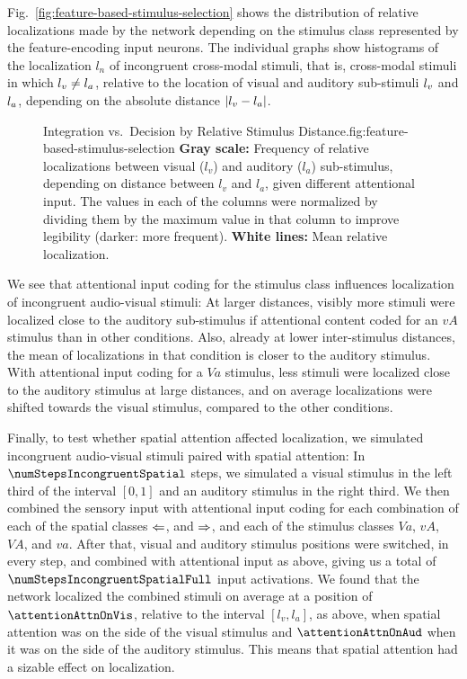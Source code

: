 		Fig.~\ref{fig:feature-based-stimulus-selection} shows the distribution of relative localizations made by the network depending on the stimulus class represented by the feature-encoding input neurons.
        The individual graphs show histograms of the localization $l_n$ of incongruent cross-modal stimuli, that is, cross-modal stimuli in which $l_v\neq l_a$, relative to the location of visual and auditory sub-stimuli $l_v$ and $l_a$, depending on the absolute distance $\lvert l_v-l_a\rvert$.
        \begin{figure}
            \centering
                \begin{legend}{Integration vs.\ Decision by Relative Stimulus Distance.}{fig:feature-based-stimulus-selection}
                    \textbf{Gray scale:} Frequency of relative localizations between visual ($l_v$) and auditory ($l_a$) sub-stimulus, depending on distance between $l_v$ and $l_a$, given different attentional input.
                    The values in each of the columns were normalized by dividing them by the maximum value in that column to improve legibility (darker: more frequent).
                    \textbf{White lines:} Mean relative localization.%
                \end{legend}
		\end{figure}
        We see that attentional input coding for the stimulus class influences localization of incongruent audio-visual stimuli:
        At larger distances, visibly more stimuli were localized close to the auditory sub-stimulus if attentional content coded for an $\mathit{vA}$ stimulus than in other conditions.
        Also, already at lower inter-stimulus distances, the mean of localizations in that condition is closer to the auditory stimulus.
        With attentional input coding for a $\mathit{Va}$ stimulus, less stimuli were localized close to the auditory stimulus at large distances, and on average localizations were shifted towards the visual stimulus, compared to the other conditions.

        Finally, to test whether spatial attention affected localization, we simulated incongruent audio-visual stimuli paired with spatial attention:
        In $\numStepsIncongruentSpatial$ steps, we simulated a visual stimulus in the left third of the interval $[0,1]$ and an auditory stimulus in the right third.
        We then combined the sensory input with attentional input coding for each combination of each of the spatial classes $\Leftarrow$, and $\Rightarrow$, and each of the stimulus classes $\mathit{Va}$, $\mathit{vA}$, $\mathit{VA}$, and $\mathit{va}$.
        After that, visual and auditory stimulus positions were switched, in every step, and combined with attentional input as above, giving us a total of $\numStepsIncongruentSpatialFull$ input activations.
        We found that the network localized the combined stimuli on average at a position of $\attentionAttnOnVis$, relative to the interval $[l_v,l_a]$, as above, when spatial attention was on the side of the visual stimulus and $\attentionAttnOnAud$ when it was on the side of the auditory stimulus.
        This means that spatial attention had a sizable effect on localization.


